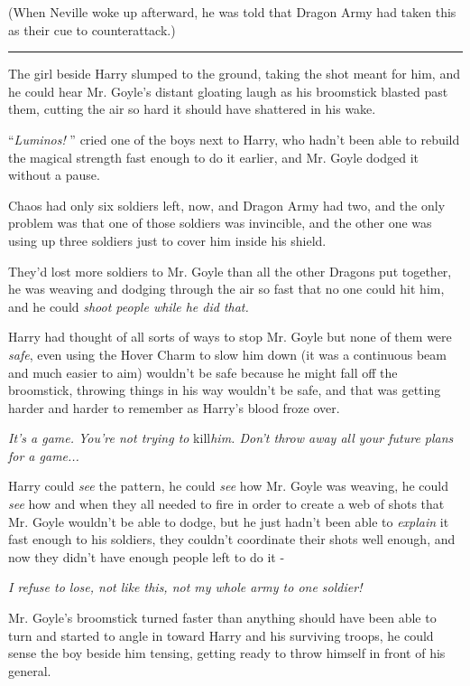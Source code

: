 (When Neville woke up afterward, he was told that Dragon Army had taken
this as their cue to counterattack.)

\begin{center}\rule{3in}{0.4pt}\end{center}

The girl beside Harry slumped to the ground, taking the shot meant for
him, and he could hear Mr. Goyle's distant gloating laugh as his
broomstick blasted past them, cutting the air so hard it should have
shattered in his wake.

``\emph{Luminos!} '' cried one of the boys next to Harry, who hadn't been
able to rebuild the magical strength fast enough to do it earlier, and
Mr. Goyle dodged it without a pause.

Chaos had only six soldiers left, now, and Dragon Army had two, and the
only problem was that one of those soldiers was invincible, and the
other one was using up three soldiers just to cover him inside his
shield.

They'd lost more soldiers to Mr. Goyle than all the other Dragons put
together, he was weaving and dodging through the air so fast that no one
could hit him, and he could \emph{shoot people while he did that.}

Harry had thought of all sorts of ways to stop Mr. Goyle but none of
them were \emph{safe}, even using the Hover Charm to slow him down (it
was a continuous beam and much easier to aim) wouldn't be safe because
he might fall off the broomstick, throwing things in his way wouldn't be
safe, and that was getting harder and harder to remember as Harry's
blood froze over.

\emph{It's a game. You're not trying to} kill\emph{him. Don't throw away
all your future plans for a game...}

Harry could \emph{see} the pattern, he could \emph{see} how Mr. Goyle
was weaving, he could \emph{see} how and when they all needed to fire in
order to create a web of shots that Mr. Goyle wouldn't be able to dodge,
but he just hadn't been able to \emph{explain} it fast enough to his
soldiers, they couldn't coordinate their shots well enough, and now they
didn't have enough people left to do it -

\emph{I refuse to lose, not like this, not my whole army to one
soldier!}

Mr. Goyle's broomstick turned faster than anything should have been able
to turn and started to angle in toward Harry and his surviving troops,
he could sense the boy beside him tensing, getting ready to throw
himself in front of his general.

